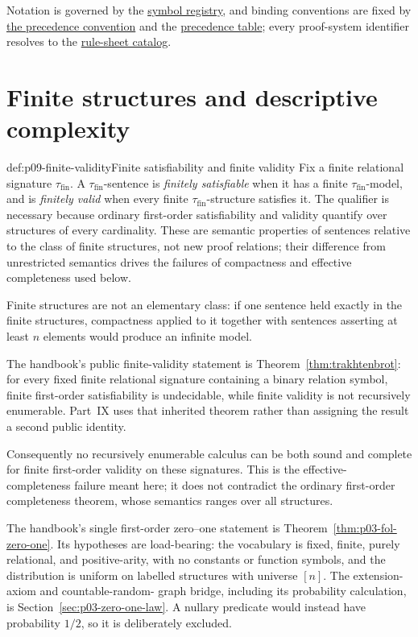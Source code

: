 Notation is governed by the
\hyperref[sec:p01-symbol-registry]{symbol registry}, and binding
conventions are fixed by
\hyperref[def:p01-w02-p01-026-precedence]{the precedence convention} and
the \hyperref[tab:p01-precedence]{precedence table}; every proof-system identifier
resolves to the \hyperref[sec:p14-rule-sheets]{rule-sheet catalog}.

\section{Finite structures and descriptive complexity}
\label{sec:p09-finite-structures}

\begin{hbdefinition}{def:p09-finite-validity}{Finite satisfiability and finite validity}
Fix a finite relational signature \(\tau_{\mathrm{fin}}\). A
\(\tau_{\mathrm{fin}}\)-sentence is
\emph{finitely satisfiable} when it has a finite
\(\tau_{\mathrm{fin}}\)-model, and is \emph{finitely valid} when every finite
\(\tau_{\mathrm{fin}}\)-structure satisfies it.
The qualifier is necessary because ordinary first-order satisfiability and
validity quantify over structures of every cardinality. These are semantic
properties of sentences relative to the class of finite structures, not new
proof relations; their difference from unrestricted semantics drives the
failures of compactness and effective completeness used below.
\end{hbdefinition}

Finite structures are not an elementary class: if one sentence held exactly
in the finite structures, compactness applied to it together with sentences
asserting at least \(n\) elements would produce an infinite model.

The handbook's public finite-validity statement is
Theorem~\ref{thm:trakhtenbrot}: for every fixed finite relational signature
containing a binary relation symbol, finite first-order satisfiability is
undecidable, while finite validity is not recursively enumerable.  Part~IX
uses that inherited theorem rather than assigning the result a second public
identity.

Consequently no recursively enumerable calculus can be both sound and complete
for finite first-order validity on these signatures.  This is the effective-
completeness failure meant here; it does not contradict the ordinary
first-order completeness theorem, whose semantics ranges over all structures.

The handbook's single first-order zero--one statement is
Theorem~\ref{thm:p03-fol-zero-one}.  Its hypotheses are load-bearing: the
vocabulary is fixed, finite, purely relational, and positive-arity, with no
constants or function symbols, and the distribution is uniform on labelled
structures with universe \([n]\).  The extension-axiom and countable-random-
graph bridge, including its probability calculation, is
Section~\ref{sec:p03-zero-one-law}.  A nullary predicate would instead have
probability \(1/2\), so it is deliberately excluded.

